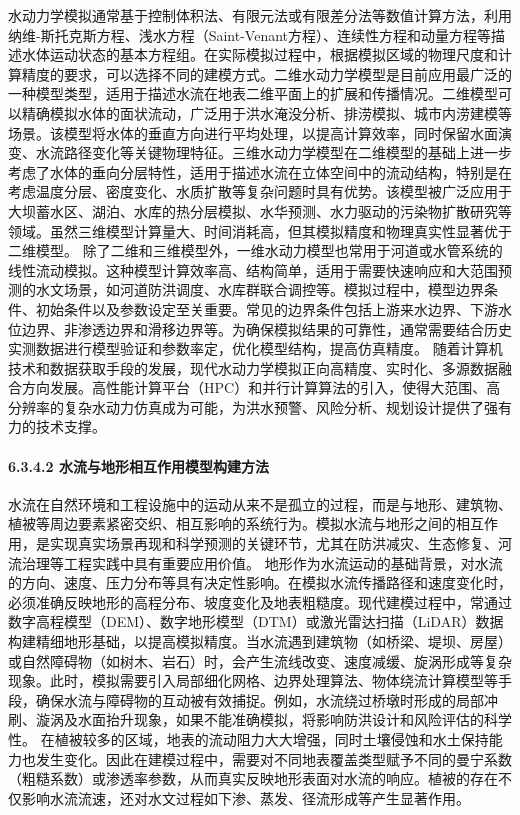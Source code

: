 水动力学模拟通常基于控制体积法、有限元法或有限差分法等数值计算方法，利用纳维-斯托克斯方程、浅水方程（Saint-Venant方程）、连续性方程和动量方程等描述水体运动状态的基本方程组。在实际模拟过程中，根据模拟区域的物理尺度和计算精度的要求，可以选择不同的建模方式。二维水动力学模型是目前应用最广泛的一种模型类型，适用于描述水流在地表二维平面上的扩展和传播情况。二维模型可以精确模拟水体的面状流动，广泛用于洪水淹没分析、排涝模拟、城市内涝建模等场景。该模型将水体的垂直方向进行平均处理，以提高计算效率，同时保留水面演变、水流路径变化等关键物理特征。三维水动力学模型在二维模型的基础上进一步考虑了水体的垂向分层特性，适用于描述水流在立体空间中的流动结构，特别是在考虑温度分层、密度变化、水质扩散等复杂问题时具有优势。该模型被广泛应用于大坝蓄水区、湖泊、水库的热分层模拟、水华预测、水力驱动的污染物扩散研究等领域。虽然三维模型计算量大、时间消耗高，但其模拟精度和物理真实性显著优于二维模型。 除了二维和三维模型外，一维水动力模型也常用于河道或水管系统的线性流动模拟。这种模型计算效率高、结构简单，适用于需要快速响应和大范围预测的水文场景，如河道防洪调度、水库群联合调控等。模拟过程中，模型边界条件、初始条件以及参数设定至关重要。常见的边界条件包括上游来水边界、下游水位边界、非渗透边界和滑移边界等。为确保模拟结果的可靠性，通常需要结合历史实测数据进行模型验证和参数率定，优化模型结构，提高仿真精度。 随着计算机技术和数据获取手段的发展，现代水动力学模拟正向高精度、实时化、多源数据融合方向发展。高性能计算平台（HPC）和并行计算算法的引入，使得大范围、高分辨率的复杂水动力仿真成为可能，为洪水预警、风险分析、规划设计提供了强有力的技术支撑。 \paragraph{6.3.4.2 水流与地形相互作用模型构建方法}\label{ux6c34ux6d41ux4e0eux5730ux5f62ux76f8ux4e92ux4f5cux7528ux6a21ux578bux6784ux5efaux65b9ux6cd5} 水流在自然环境和工程设施中的运动从来不是孤立的过程，而是与地形、建筑物、植被等周边要素紧密交织、相互影响的系统行为。模拟水流与地形之间的相互作用，是实现真实场景再现和科学预测的关键环节，尤其在防洪减灾、生态修复、河流治理等工程实践中具有重要应用价值。 地形作为水流运动的基础背景，对水流的方向、速度、压力分布等具有决定性影响。在模拟水流传播路径和速度变化时，必须准确反映地形的高程分布、坡度变化及地表粗糙度。现代建模过程中，常通过数字高程模型（DEM）、数字地形模型（DTM）或激光雷达扫描（LiDAR）数据构建精细地形基础，以提高模拟精度。当水流遇到建筑物（如桥梁、堤坝、房屋）或自然障碍物（如树木、岩石）时，会产生流线改变、速度减缓、旋涡形成等复杂现象。此时，模拟需要引入局部细化网格、边界处理算法、物体绕流计算模型等手段，确保水流与障碍物的互动被有效捕捉。例如，水流绕过桥墩时形成的局部冲刷、漩涡及水面抬升现象，如果不能准确模拟，将影响防洪设计和风险评估的科学性。 在植被较多的区域，地表的流动阻力大大增强，同时土壤侵蚀和水土保持能力也发生变化。因此在建模过程中，需要对不同地表覆盖类型赋予不同的曼宁系数（粗糙系数）或渗透率参数，从而真实反映地形表面对水流的响应。植被的存在不仅影响水流流速，还对水文过程如下渗、蒸发、径流形成等产生显著作用。 